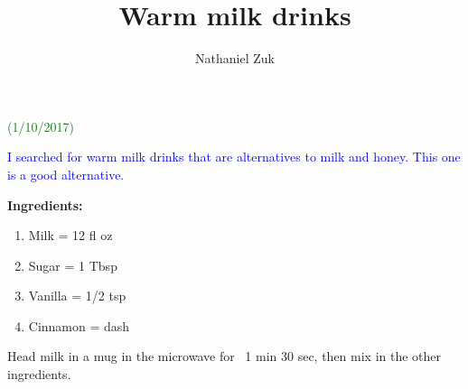 \usepackage{parskip}
\usepackage{color}

\title{Warm milk drinks}
\author{Nathaniel Zuk}


\maketitle

\textcolor{green}{(1/10/2017)}

\textcolor{blue}{I searched for warm milk drinks that are alternatives to milk and honey.  This one is a good alternative.}

\textbf{Ingredients:}

\begin{enumerate}
\item Milk = 12 fl oz
\item Sugar = 1 Tbsp
\item Vanilla = 1/2 tsp
\item Cinnamon = dash
\end{enumerate}

Head milk in a mug in the microwave for ~1 min 30 sec, then mix in the other ingredients.

